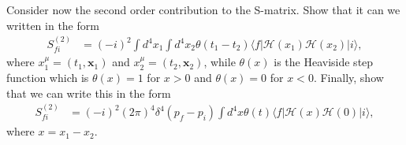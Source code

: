 \documentclass[working, oneside]{../../Preambles/tuftebook}
\begin{document}
\begin{exercise}[9]
Consider now the second order contribution to the S-matrix. Show that it can we written in the form
\begin{align*}
S_{fi}^{(2)}
&= (-i)^2 \int d^4 x_1 \int d^4 x_2 \theta(t_1 - t_2) \langle f | \mathcal{H}(x_1) \mathcal{H}(x_2) | i \rangle, \tag{56}
\end{align*}
where \( x_1^\mu = (t_1, \mathbf{x}_1) \) and \( x_2^\mu = (t_2, \mathbf{x}_2) \), while \( \theta(x) \) is the Heaviside step function which is \( \theta(x) = 1 \) for \( x > 0 \) and \( \theta(x) = 0 \) for \( x < 0 \). Finally, show that we can write this in the form
\begin{align*}
S_{fi}^{(2)}
&= (-i)^2 (2\pi)^4 \delta^4(p_f - p_i) \int d^4 x \theta(t) \langle f | \mathcal{H}(x) \mathcal{H}(0) | i \rangle, \tag{57}
\end{align*}
where \( x = x_1 - x_2 \).
\end{exercise}
\end{document}
